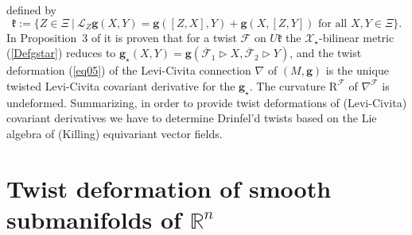 \documentclass[a4paper,11pt]{article}
\begin{document}
defined by
\begin{equation}
    \mathfrak{k}:=\{Z\in\Xi~|~\mathcal{L}_Z\mathbf{g}(X,Y)
    =\mathbf{g}([Z,X],Y)+\mathbf{g}(X,[Z,Y])
    \text{ for all }X,Y\in\Xi\}.
\end{equation}
In Proposition~3 of \cite{FioreWeber} it is proven that for a twist $\mathcal{F}$ 
on $U\mathfrak{k}$  the  $\mathcal{X}_\star$-bilinear metric 
(\ref{Defgstar}) reduces to  $\mathbf{g}_\star(X,Y)=
\mathbf{g}(\overline{\mathcal{F}}_1\rhd X,\overline{\mathcal{F}}_2\rhd Y)$, 
 and the twist deformation (\ref{eq05}) of the Levi-Civita connection
$\nabla$ of $(M,\mathbf{g})$ is the unique twisted Levi-Civita covariant derivative for
the $\mathbf{g}_\star$. The curvature $\mathrm{R}^\mathcal{F}$ of $\nabla^\mathcal{F}$
is undeformed. Summarizing, in order to provide twist deformations of (Levi-Civita)
covariant derivatives we have to determine Drinfel'd twists based on the Lie algebra
of (Killing) equivariant vector fields.

\section{Twist deformation of smooth submanifolds of \texorpdfstring{$\mathbb{R}^n$}{Rn}}\label{Chap3}
\end{document}
